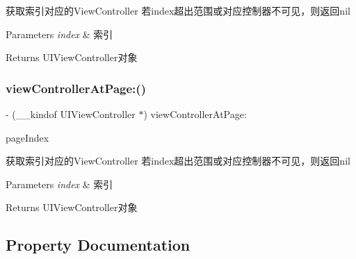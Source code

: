 获取索引对应的\+View\+Controller 若index超出范围或对应控制器不可见，则返回nil


\begin{DoxyParams}{Parameters}
{\em index} & 索引\\
\hline
\end{DoxyParams}
\begin{DoxyReturn}{Returns}
U\+I\+View\+Controller对象 
\end{DoxyReturn}
\mbox{\label{interface_v_t_magic_controller_ac79d790a9883586d281782ceeb5d7ef3}} 
\subsubsection{\texorpdfstring{view\+Controller\+At\+Page\+:()}{viewControllerAtPage:()}\hspace{0.1cm}{\footnotesize\ttfamily [3/3]}}
{\footnotesize\ttfamily -\/ (\+\_\+\+\_\+kindof U\+I\+View\+Controller $\ast$) view\+Controller\+At\+Page\+: \begin{DoxyParamCaption}\item[{(N\+S\+U\+Integer)}]{page\+Index }\end{DoxyParamCaption}}

获取索引对应的\+View\+Controller 若index超出范围或对应控制器不可见，则返回nil


\begin{DoxyParams}{Parameters}
{\em index} & 索引\\
\hline
\end{DoxyParams}
\begin{DoxyReturn}{Returns}
U\+I\+View\+Controller对象 
\end{DoxyReturn}


\subsection{Property Documentation}
\mbox{\label{interface_v_t_magic_controller_ae64ac7e541c6ebb74ff031726deb5ab1}} 

